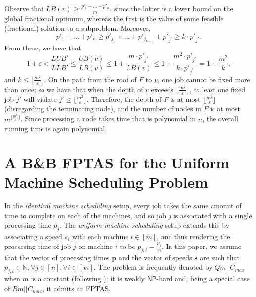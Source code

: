 \documentclass[moor,sglanonrev]{informs4}
\theoremstyle{plain}
\begin{document}
    Observe that $LB(v) \ge \frac{p'_1 + \ldots + p'_n}{m}$, since the latter is a lower bound on the global fractional optimum, whereas the first is the value of some feasible (fractional) solution to a subproblem. Moreover,
    \[
    p'_1 + \ldots + p'_n \ge p'_{j_1} + \ldots + p'_{j_{k-1}} + p'_{j^*} \ge k \cdot p'_{j^*}.
    \]
    From these, we have that
    \begin{equation}
        1+\varepsilon < \frac{LUB'}{LLB'}\le \frac{UB(v)}{LB(v)} \le 1+\frac{m\cdot p'_{j^*}}{LB(v)} \le1+ \frac{m^2\cdot p'_{j^*}}{k\cdot p'_{j^*}}= 1 + \frac{m^2}{k},
    \end{equation}
    and $k \le \lfloor \frac{m^2}{\varepsilon}\rfloor$. On the path from the root of $F$ to $v$, one job cannot be fixed more than once; so we have that when the depth of $v$ exceeds $\lfloor\frac{m^2}{\varepsilon} \rfloor$, at least one fixed job $j'$ will violate $j' \le \lfloor\frac{m^2}{\varepsilon}\rfloor$. Therefore, the depth of $F$ is at most $\lfloor\frac{m^2}{\varepsilon}\rfloor$ (disregarding the terminating node), and the number of nodes in $F$ is at most $m^{\lfloor\frac{m^2}{\varepsilon}\rfloor}$. Since processing a node takes time that is polynomial in $n$, the overall running time is again polynomial. \hfill \Halmos
\endproof


\section{A B\&B FPTAS for the Uniform Machine Scheduling Problem}\label{sec:js:fptas}

In the \emph{identical machine scheduling} setup, every job takes the same amount of time to complete on each of the machines, and so job $j$ is associated with a single processing time $p_j$. The \emph{uniform machine scheduling} setup extends this by associating a speed $s_i$ with each machine $i \in [m]$, and thus rendering the processing time of job $j$ on machine $i$ to be $p_{j, i} = \frac{p_j}{s_i}$. In this paper, we assume that the vector of processing times $\bm{p}$ and the vector of speeds $\bm{s}$ are such that $p_{j,i} \in \mathbb{N}, \forall j \in [n], \forall i \in [m]$. The problem is frequently denoted by $Qm||C_{max}$ when $m$ is a constant (following \cite{machine_scheduling_review}); it is weakly $\textsf{NP}$-hard and, being a special case of $Rm||C_{max}$, it admits an FPTAS.
\end{document}
